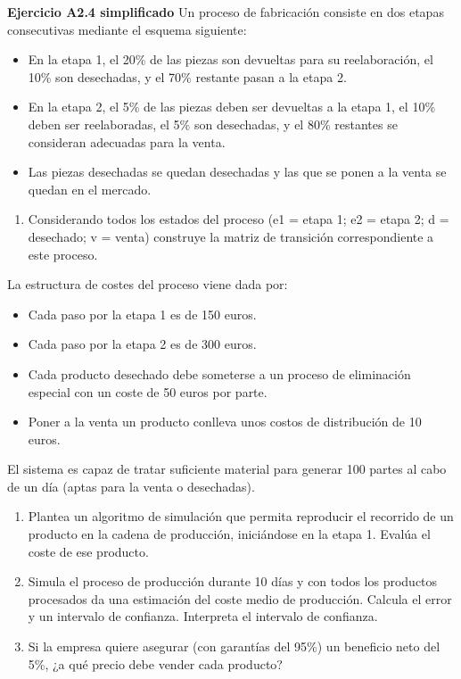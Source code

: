 \documentclass[
]{book}
\providecommand{\tightlist}{%
  \setlength{\itemsep}{0pt}\setlength{\parskip}{0pt}}
\theoremstyle{definition}
\theoremstyle{definition}
\theoremstyle{definition}
\theoremstyle{definition}
\theoremstyle{remark}
\begin{document}
\textbf{Ejercicio A2.4 simplificado}
Un proceso de fabricación consiste en dos etapas consecutivas mediante el esquema siguiente:

\begin{itemize}
\tightlist
\item
  En la etapa 1, el 20\% de las piezas son devueltas para su reelaboración, el 10\% son desechadas, y el 70\% restante pasan a la etapa 2.
\item
  En la etapa 2, el 5\% de las piezas deben ser devueltas a la etapa 1, el 10\% deben ser reelaboradas, el 5\% son desechadas, y el 80\% restantes se consideran adecuadas para la venta.
\item
  Las piezas desechadas se quedan desechadas y las que se ponen a la venta se quedan en el mercado.
\end{itemize}

\begin{enumerate}
\def\labelenumi{\arabic{enumi}.}
\tightlist
\item
  Considerando todos los estados del proceso (e1 = etapa 1; e2 = etapa 2; d = desechado; v = venta) construye la matriz de transición correspondiente a este proceso.
\end{enumerate}

La estructura de costes del proceso viene dada por:

\begin{itemize}
\tightlist
\item
  Cada paso por la etapa 1 es de 150 euros.
\item
  Cada paso por la etapa 2 es de 300 euros.
\item
  Cada producto desechado debe someterse a un proceso de eliminación especial con un coste de 50 euros por parte.
\item
  Poner a la venta un producto conlleva unos costos de distribución de 10 euros.
\end{itemize}

El sistema es capaz de tratar suficiente material para generar 100 partes al cabo de un día (aptas para la venta o desechadas).

\begin{enumerate}
\def\labelenumi{\arabic{enumi}.}
\setcounter{enumi}{1}
\item
  Plantea un algoritmo de simulación que permita reproducir el recorrido de un producto en la cadena de producción, iniciándose en la etapa 1. Evalúa el coste de ese producto.
\item
  Simula el proceso de producción durante 10 días y con todos los productos procesados da una estimación del coste medio de producción. Calcula el error y un intervalo de confianza. Interpreta el intervalo de confianza.
\item
  Si la empresa quiere asegurar (con garantías del 95\%) un beneficio neto del 5\%, ¿a qué precio debe vender cada producto?
\end{enumerate}
\end{document}
